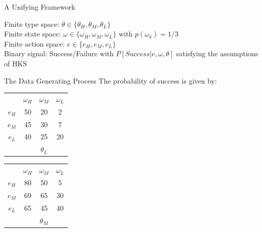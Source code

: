 \documentclass[aspectratio=169]{beamer}
\begin{document}
\begin{frame}{A Unifying Framework}

Finite type space: $\theta \in \{\theta_H, \theta_M, \theta_L\}$\\
\bigskip
Finite state space: $\omega \in \{\omega_H, \omega_M, \omega_L\}$
with $p(\omega_k)=1/3$ \\
\bigskip
Finite action space: $e \in \{e_H, e_M, e_L\}$\\
\bigskip
Binary signal: Success/Failure with $P\left[Success|e, \omega, \theta\right]$ satisfying the assumptions of HKS


\end{frame}

\begin{frame}{The Data Generating Process}
The probability of success is given by:\\
\bigskip
\centering
\begin{tabular}{ c|c|c|c|}
  
  \multicolumn{1}{c}{} & \multicolumn{1}{c}{$\omega_H$} & \multicolumn{1}{c}{$\omega_M$} & \multicolumn{1}{c}{$\omega_L$}\\
  \cline{2-4}
  $e_H$ & 50 & 20 & 2 \\
  \cline{2-4}
  $e_M$ & 45 & 30 & 7 \\
  \cline{2-4}
  $e_L$ & 40 & 25 & 20 \\
  \cline{2-4}
  \multicolumn{1}{c}{} & \multicolumn{1}{c}{} & \multicolumn{1}{c}{$\theta_L$} & \multicolumn{1}{c}{}\\
\end{tabular}
\hspace{.3cm} %
\begin{tabular}{ c|c|c|c|}
  
  \multicolumn{1}{c}{} & \multicolumn{1}{c}{$\omega_H$} & \multicolumn{1}{c}{$\omega_M$} & \multicolumn{1}{c}{$\omega_L$}\\
  \cline{2-4}
  $e_H$ & 80 & 50 & 5 \\
  \cline{2-4}
  $e_M$ & 69 & 65 & 30 \\
  \cline{2-4}
  $e_L$ & 65 & 45 & 40 \\
  \cline{2-4}
  \multicolumn{1}{c}{} & \multicolumn{1}{c}{} & \multicolumn{1}{c}{$\theta_M$} & \multicolumn{1}{c}{}\\
\end{tabular}
\hspace{.3cm} %
\begin{tabular}{ c|c|c|c|}
  

\end{tabular}
\end{frame}
\end{document}
